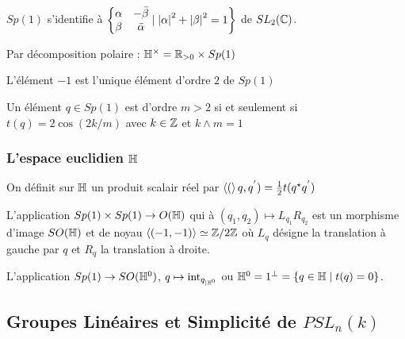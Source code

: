 \documentclass{cours}
\begin{document}
\begin{remark}
    $Sp(1)$ s'identifie à $\left\{\begin{matrix}\alpha & -\bar{\beta} \\ \beta & \bar{\alpha}\end{matrix}\mid \left|\alpha\right|^{2} + \left|\beta\right|^{2} = 1\right\}$ de $SL_{2}(\mathbb{C})$.
\end{remark}

\begin{proposition}
    Par décomposition polaire : $\mathbb{H}^{\times} = \mathbb{R}_{> 0} \times Sp(1)$
\end{proposition}

\begin{proposition}
    L'élément $-1$ est l'unique élément d'ordre $2$ de $Sp(1)$
\end{proposition}

\begin{proposition}
    Un élément $q \in Sp(1)$ est d'ordre $m > 2$ si et seulement si $t(q) = 2 \cos(2k / m)$ avec $k \in \mathbb{Z}$ et $k \wedge m = 1$
\end{proposition}

\subsubsection{L'espace euclidien $\mathbb{H}$}
\begin{definition}
    On définit sur $\mathbb{H}$ un produit scalair réel par $\left\langle ( \right\rangle q, q^{'}) = \frac{1}{2}t(q^{\star}q^{'})$
\end{definition}

\begin{proposition}
    L'application $Sp(1) \times Sp(1) \to O(\mathbb{H})$ qui à $\left(q_{1}, q_{2}\right) \mapsto L_{q_{1}}R_{q_{2}}$ est un morphisme d'image $SO(\mathbb{H})$ et de noyau $\left\langle (-1, -1) \right\rangle \simeq \mathbb{Z}/2\mathbb{Z}$ où $L_{q}$ désigne la translation à gauche par $q$ et $R_{q}$ la translation à droite.
\end{proposition}

\begin{proposition}
    L'application $Sp(1) \rightarrow SO(\mathbb{H}^{0})$, $q\mapsto \text{int}_{q_{\mid\mathbb{H}^{0}}}$ ou $\mathbb{H}^{0} = 1^{\perp} = \left\{q \in \mathbb{H} \mid t(q) = 0\right\}$.
\end{proposition}

\subsection{Groupes Linéaires et Simplicité de $PSL_{n}(k)$}
\end{document}

